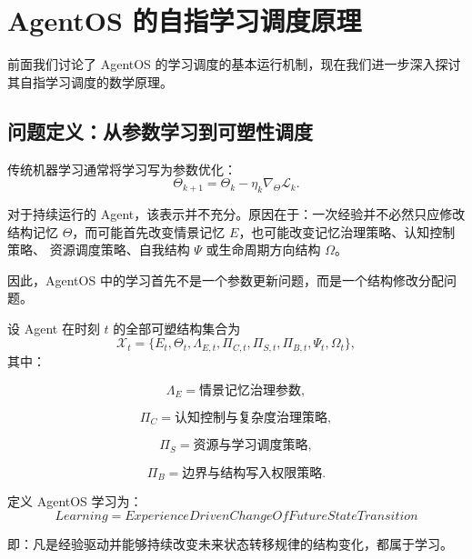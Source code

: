 \chapter{AgentOS 的自指学习调度原理}

前面我们讨论了 AgentOS 的学习调度的基本运行机制，现在我们进一步深入探讨其自指学习调度的数学原理。

\section{问题定义：从参数学习到可塑性调度}

传统机器学习通常将学习写为参数优化：
\begin{equation}
\Theta_{k+1}
=
\Theta_k
-
\eta_k
\nabla_{\Theta}\mathcal{L}_k .
\end{equation}

对于持续运行的 Agent，该表示并不充分。原因在于：一次经验并不必然只应修改结构记忆
$\Theta$，而可能首先改变情景记忆 $E$，也可能改变记忆治理策略、认知控制策略、
资源调度策略、自我结构 $\Psi$ 或生命周期方向结构 $\Omega$。

因此，AgentOS 中的学习首先不是一个参数更新问题，而是一个结构修改分配问题。

设 Agent 在时刻 $t$ 的全部可塑结构集合为
\begin{equation}
\mathcal{X}_t
=
\{
E_t,
\Theta_t,
\Lambda_{E,t},
\Pi_{C,t},
\Pi_{S,t},
\Pi_{B,t},
\Psi_t,
\Omega_t
\},
\end{equation}
其中：

\begin{equation}
\Lambda_E
=
\text{情景记忆治理参数},
\end{equation}

\begin{equation}
\Pi_C
=
\text{认知控制与复杂度治理策略},
\end{equation}

\begin{equation}
\Pi_S
=
\text{资源与学习调度策略},
\end{equation}

\begin{equation}
\Pi_B
=
\text{边界与结构写入权限策略}.
\end{equation}

定义 AgentOS 学习为：
\begin{equation}
\boxed{
Learning
=
ExperienceDrivenChangeOfFutureStateTransition
}
\end{equation}

即：凡是经验驱动并能够持续改变未来状态转移规律的结构变化，都属于学习。

